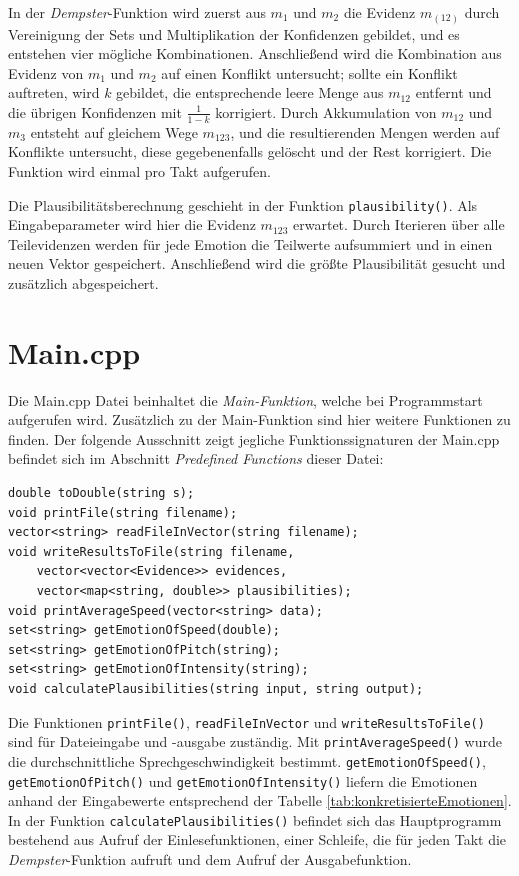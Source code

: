In der \textit{Dempster}-Funktion wird zuerst aus \(m_1\) und \(m_2\) die Evidenz \(m_(12)\) durch Vereinigung der Sets und Multiplikation der Konfidenzen gebildet, und es entstehen vier mögliche Kombinationen. Anschließend wird die Kombination aus Evidenz von \(m_1\) und \(m_2\) auf einen Konflikt untersucht; sollte ein Konflikt auftreten, wird \(k\) gebildet, die entsprechende leere Menge aus \(m_{12}\) entfernt und die übrigen Konfidenzen mit \(\frac{1}{1-k}\) korrigiert. Durch Akkumulation von \(m_{12}\) und \(m_3\) entsteht auf gleichem Wege \(m_{123}\), und die resultierenden Mengen werden auf Konflikte untersucht, diese gegebenenfalls gelöscht und der Rest korrigiert. Die Funktion wird einmal pro Takt aufgerufen.
 
Die Plausibilitätsberechnung geschieht in der Funktion \verb|plausibility()|. Als Eingabeparameter wird hier die Evidenz \(m_{123}\) erwartet. Durch Iterieren über alle Teilevidenzen werden für jede Emotion die Teilwerte aufsummiert und in einen neuen Vektor gespeichert. Anschließend wird die größte Plausibilität gesucht und zusätzlich abgespeichert.
 
\section{Main.cpp}
Die Main.cpp Datei beinhaltet die \textit{Main-Funktion}, welche bei Programmstart aufgerufen wird.
Zusätzlich zu der Main-Funktion sind hier weitere Funktionen zu finden. Der folgende Ausschnitt zeigt jegliche Funktionssignaturen der Main.cpp befindet sich im Abschnitt \textit{Predefined Functions} dieser Datei: 

\begin{lstlisting}[caption=Predefined classes/functions aus der Main.cpp, label=Bsp.1]
double toDouble(string s);
void printFile(string filename);
vector<string> readFileInVector(string filename);
void writeResultsToFile(string filename, 
	vector<vector<Evidence>> evidences, 
	vector<map<string, double>> plausibilities);
void printAverageSpeed(vector<string> data);
set<string> getEmotionOfSpeed(double);
set<string> getEmotionOfPitch(string);
set<string> getEmotionOfIntensity(string);
void calculatePlausibilities(string input, string output);
\end{lstlisting}

Die Funktionen \verb|printFile()|, \verb|readFileInVector| und \verb|writeResultsToFile()| sind  für Dateieingabe und -ausgabe zuständig. Mit \verb|printAverageSpeed()| wurde die durchschnittliche Sprechgeschwindigkeit bestimmt. \verb|getEmotionOfSpeed()|, \verb|getEmotionOfPitch()| und \verb|getEmotionOfIntensity()| liefern die Emotionen anhand der Eingabewerte entsprechend der Tabelle \ref{tab:konkretisierteEmotionen}. In der Funktion \verb|calculatePlausibilities()| befindet sich das Hauptprogramm bestehend aus Aufruf der Einlesefunktionen, einer Schleife, die für jeden Takt die \textit{Dempster}-Funktion aufruft und dem Aufruf der Ausgabefunktion.
